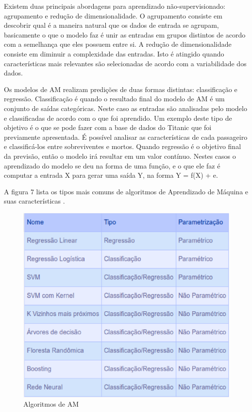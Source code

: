 Existem duas principais abordagens para aprendizado não-supervisionado: agrupamento e redução de dimensionalidade. O agrupamento consiste em descobrir qual é a maneira natural que os dados de entrada se agrupam, basicamente o que o modelo faz é unir as entradas em grupos distintos de acordo com a semelhança que eles possuem entre si. A redução de dimensionalidade consiste em diminuir a complexidade das entradas. Isto é atingido quando características mais relevantes são selecionadas de acordo com a variabilidade dos dados.

Os modelos de AM realizam predições de duas formas distintas: classificação e regressão. Classificação é quando o resultado final do modelo de AM é um conjunto de saídas categóricas. Neste caso as entradas são analisadas pelo modelo e classificadas de acordo com o que foi aprendido. Um exemplo deste tipo de objetivo é o que se pode fazer com a base de dados do Titanic que foi previamente apresentada. É possível analisar as características de cada passageiro e classificá-los entre sobreviventes e mortos. Quando regressão é o objetivo final da previsão, então o modelo irá resultar em um valor contínuo. Nestes casos o aprendizado do modelo se deu na forma de uma função, e o que ele faz é  computar a entrada X para gerar uma saída Y, na forma Y = f(X) + e. 

A figura 7 lista os tipos mais comuns de algoritmos de Aprendizado de Máquina e suas características \cite{real2013}.


\begin{figure}[!h]
\centering
\includegraphics[keepaspectratio=true,scale=0.60]
{figuras/Tipos_de_Modelo.eps}
\caption{Algoritmos de AM}
\label{over}
\end{figure}

